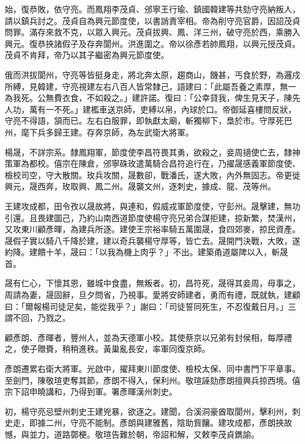 \begin{pinyinscope}
 始，復恭敗，依守亮。而鳳翔李茂貞、邠寧王行瑜、鎮國韓建等共劾守亮納叛人，請以鎮兵討之。茂貞自為興元節度使，以書誚責宰相。帝為削守亮官爵，因詔茂貞問罪。滿存來救不克，以眾入興元。茂貞拔興、鳳、洋三州，破守亮於西，乘勝入興元。復恭挾諸假子及存奔閬州。洪進圍之。帝以徐彥若帥鳳翔，以興元授茂貞。茂貞不肯拜，帝乃以其子繼密為興元節度使。



 俄而洪拔閬州，守亮等皆挺身走，將北奔太原，趨商山，饑甚，丐食於野，為邏戍所縛，見韓建，守亮視建左右八百人皆常隸己，語建曰：「此屬吾養之素厚，無一為我死。公無費衣食，不如殺之。」建許諾。復曰：「公幸貸我，俾生見天子，陳先人功，萬有一不死。」建檻車送京師，吏縛以帛，內球於口。帝御延喜樓問反狀，守亮不得語，頷而已。左右白服罪，即執獻太廟，斬獨柳下，梟於市。守厚死巴州，麾下兵多歸王建。存奔京師，為左武衛大將軍。



 楊晟，不詳宗系。隸鳳翔軍，節度使李昌符畏其勇，欲殺之，妾周擿使亡去，隸神策軍為都校。僖宗在陳倉，邠寧硃玫遣萬騎合昌符追行在，乃擢晟感義軍節度使、檢校司空，守大散關。玫兵攻關，晟數卻，戰潘氏，遂大敗，內外無固志。帝更徙興元，晟西奔，玫取興、鳳二州。晟襲文州，逐刺史，據成、龍、茂等州。



 王建攻成都，田令孜以晟故將，與連和，假威戎軍節度使，守彭州。晟擊建，無功引還。且畏建圖己，乃約山南西道節度使楊守亮兄弟合謀拒建，掠新繁，焚漢州，又攻東川顧彥暉，為建兵所逐。建使王宗裕率騎五萬圍晟，食四郊麥，掠民資產。晟假子實以騎八千降於建，建以奇兵襲楊守厚等，皆亡去。晟開門決戰，大敗，遂約降。建饋十羊，晟曰：「以我為機上肉乎？」不出。建築甬道屬陴以入，斬晟首。



 晟有仁心，下懷其恩，雖城中食盡，無叛者。初，昌符死，晟得其妾周，母事之，周請為妻，晟固辭，旦夕問省，乃視事。愛將安師建者，勇而有禮，既就執，建顧曰：「爾報楊司徒足矣，能從我乎？」謝曰：「司徒誓同死生，不忍復戴日月。」三謂不回，乃戮之。



 顧彥朗、彥暉者，豐州人，並為天德軍小校。其使蔡京以兄弟有封侯相，每厚禮之，使子贈賚，稍稍進秩。黃巢亂長安，率軍同復京師。



 彥朗遷累右衛大將軍。光啟中，擢拜東川節度使、檢校太保、同中書門下平章事。至劍門，陳敬瑄吏奪其節，彥朗不得入，保利州。敬瑄誣劾彥朗擅興兵掠西境。僖宗下詔申曉講和，乃得到軍。署彥暉漢州刺史。



 初，楊守亮忌壁州刺史王建兇暴，欲逐之。建聞，合溪洞豪酋取閬州，擊利州，刺史走，即據二州，守亮不能制。彥朗與建雅舊，陰助貲饟。建攻成都，彥朗挾故憾，與並力，道路鄣梗。敬瑄告難於朝，帝詔和解，又敕李茂貞鐫諭。




\end{pinyinscope}
